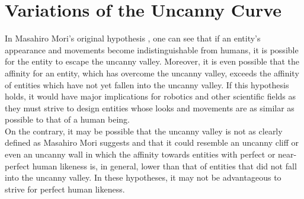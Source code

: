 \chapter{Variations of the Uncanny Curve}
In Masahiro Mori’s original hypothesis \cite{original_masahiro}, one can see that if an entity's appearance and movements become indistinguishable from humans, it is possible for the entity to escape the uncanny valley. Moreover, it is even possible that the affinity for an entity, which has overcome the uncanny valley, exceeds the affinity of entities which have not yet fallen into the uncanny valley. If this hypothesis holds, it would have major implications for robotics and other scientific fields as they must strive to design entities whose looks and movements are as similar as possible to that of a human being.\\
On the contrary, it may be possible that the uncanny valley  is not as clearly defined as Masahiro Mori suggests and that it could resemble an uncanny cliff or even an uncanny wall in which the affinity towards entities with perfect or near-perfect human likeness is, in general, lower than that of entities that did not fall into the uncanny valley. In these hypotheses, it may not be advantageous to strive for perfect human likeness.

